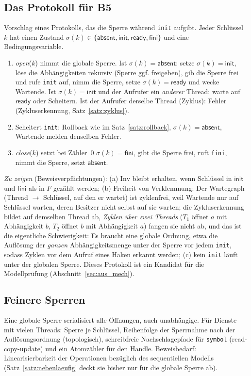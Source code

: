 \documentclass[a4paper,12pt,twoside]{report}
\DeclareRobustCommand{\_}{\ifmmode\mbox{\textunderscore}\else\textunderscore\allowbreak{}\fi}
\theoremstyle{definition}
\newcommand{\Bf}[1]{\textbf{B#1}}
\begin{document}
\subsection{Das Protokoll für \Bf{5}}
Vorschlag eines Protokolls, das die Sperre während \texttt{init} aufgibt. Jeder Schlüssel $k$ hat einen Zustand $\sigma(k)\in\{\mathsf{absent},\mathsf{init},\mathsf{ready},\mathsf{fini}\}$ und eine Bedingungsvariable.
\begin{enumerate}
	\item \emph{open}($k$) nimmt die globale Sperre. Ist $\sigma(k)=\mathsf{absent}$: setze $\sigma(k)=\mathsf{init}$, löse die Abhängigkeiten rekursiv (Sperre ggf. freigeben), gib die Sperre frei und rufe \texttt{init} auf, nimm die Sperre, setze $\sigma(k)=\mathsf{ready}$ und wecke Wartende. Ist $\sigma(k)=\mathsf{init}$ und der Aufrufer ein \emph{anderer} Thread: warte auf $\mathsf{ready}$ oder Scheitern. Ist der Aufrufer derselbe Thread (Zyklus): Fehler (Zykluserkennung, Satz~\ref{satz:zyklus}).
	\item Scheitert \texttt{init}: Rollback wie im Satz~\ref{satz:rollback}, $\sigma(k)=\mathsf{absent}$, Wartende melden denselben Fehler.
	\item \emph{close}($k$) setzt bei Zähler~$0$ $\sigma(k)=\mathsf{fini}$, gibt die Sperre frei, ruft \texttt{fini}, nimmt die Sperre, setzt $\mathsf{absent}$.
\end{enumerate}
\emph{Zu zeigen} (Beweisverpflichtungen): (a) $\mathrm{Inv}$ bleibt erhalten, wenn Schlüssel in $\mathsf{init}$ und $\mathsf{fini}$ als in $F$ gezählt werden; (b) Freiheit von Verklemmung: Der Wartegraph (Thread $\to$ Schlüssel, auf den er wartet) ist zyklenfrei, weil Wartende nur auf Schlüssel warten, deren Besitzer nicht selbst auf sie warten; die Zykluserkennung bildet auf demselben Thread ab, \emph{Zyklen über zwei Threads} ($T_1$ öffnet $a$ mit Abhängigkeit $b$, $T_2$ öffnet $b$ mit Abhängigkeit $a$) fangen sie nicht ab, und das ist die eigentliche Schwierigkeit: Es braucht eine globale Ordnung, etwa die Auflösung der \emph{ganzen} Abhängigkeitsmenge unter der Sperre vor jedem \texttt{init}, sodass Zyklen vor dem Aufruf eines Haken erkannt werden; (c) kein \texttt{init} läuft unter der globalen Sperre. Dieses Protokoll ist ein Kandidat für die Modellprüfung (Abschnitt~\ref{sec:aus_mech}).

\subsection{Feinere Sperren}
Eine globale Sperre serialisiert alle Öffnungen, auch unabhängige. Für Dienste mit vielen Threads: Sperre je Schlüssel, Reihenfolge der Sperrnahme nach der Auflösungsordnung (topologisch), schreibfreie Nachschlagepfade für \texttt{symbol} (read-copy-update) und ein Atomzähler für den Handle. Beweisbedarf: Linearisierbarkeit der Operationen bezüglich des sequentiellen Modells (Satz~\ref{satz:nebenlaeufig} deckt sie bisher nur für die globale Sperre ab).
\end{document}
